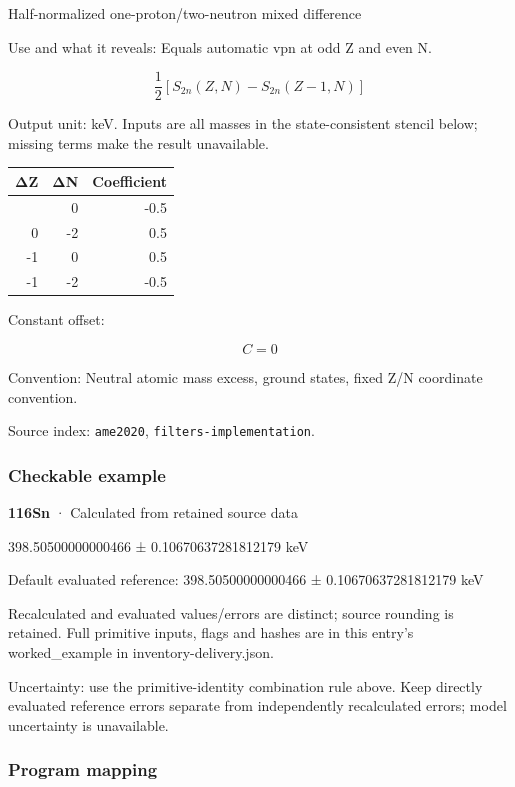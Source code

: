 \documentclass[
  11pt,
  letterpaper,
]{article}
\begin{document}
Half-normalized one-proton/two-neutron mixed difference

Use and what it reveals: Equals automatic vpn at odd Z and even N.

\[
\frac12[S_{2n}(Z,N)-S_{2n}(Z-1,N)]
\]

Output unit: keV. Inputs are all masses in the state-consistent stencil
below; missing terms make the result unavailable.

\begin{longtable}[]{@{}rrr@{}}
\toprule\noalign{}
ΔZ & ΔN & Coefficient \\
\midrule\noalign{}
\endhead
\bottomrule\noalign{}
\endlastfoot
0 & 0 & -0.5 \\
0 & -2 & 0.5 \\
-1 & 0 & 0.5 \\
-1 & -2 & -0.5 \\
\end{longtable}

Constant offset:

\[
C=0
\]

Convention: Neutral atomic mass excess, ground states, fixed Z/N
coordinate convention.

Source index: \texttt{ame2020}, \texttt{filters-implementation}.

\subsubsection{Checkable example}\label{checkable-example-34}

\textbf{116Sn} · Calculated from retained source data

398.50500000000466 ± 0.10670637281812179 keV

Default evaluated reference: 398.50500000000466 ± 0.10670637281812179
keV

Recalculated and evaluated values/errors are distinct; source rounding
is retained. Full primitive inputs, flags and hashes are in this entry's
worked\_example in inventory-delivery.json.

Uncertainty: use the primitive-identity combination rule above. Keep
directly evaluated reference errors separate from independently
recalculated errors; model uncertainty is unavailable.

\subsubsection{Program mapping}\label{program-mapping-34}
\end{document}
